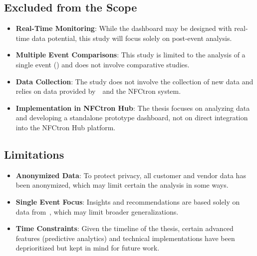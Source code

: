 \subsection*{Excluded from the Scope}
\label{subsec:introduction-scope-excluded}
\begin{itemize}
	\item \textbf{Real-Time Monitoring}: While the dashboard may be designed with real-time data potential, this study will focus solely on post-event analysis.
	\item \textbf{Multiple Event Comparisons}: This study is limited to the analysis of a single event (\theEvent) and does not involve comparative studies.
	\item \textbf{Data Collection}: The study does not involve the collection of new data and relies on data provided by~\theOrganizer~and the NFCtron system.
	\item \textbf{Implementation in NFCtron Hub}: The thesis focuses on analyzing data and developing a standalone prototype dashboard, not on direct integration into the NFCtron Hub platform.
\end{itemize}

\subsection*{Limitations}
\label{subsec:introduction-limitations}
\begin{itemize}
	\item \textbf{Anonymized Data}: To protect privacy, all customer and vendor data has been anonymized, which may limit certain the analysis in some ways.
	\item \textbf{Single Event Focus}: Insights and recommendations are based solely on data from~\theEvent, which may limit broader generalizations.
	\item \textbf{Time Constraints}: Given the timeline of the thesis, certain advanced features (\eg predictive analytics) and technical implementations have been deprioritized but kept in mind for future work.
\end{itemize}
